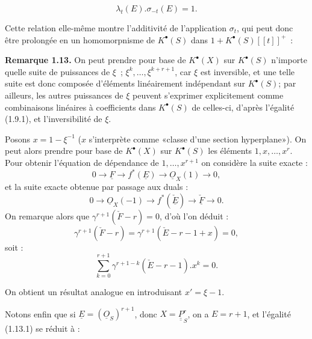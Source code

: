 
\begin{equation}\tag{1.12.1}
  \lambda_t(E).\sigma_{-t}(E)=1.
\end{equation}

Cette relation elle-même montre l'additivité de l'application \(\sigma_t\), qui peut donc être prolongée en un homomorpnisme de \(K^{\bullet}(S)\) dans \(1+K^{\bullet}(S)[[t]]^+\)~:

\textbf{Remarque 1.13.} On peut prendre pour base de \(K^{\bullet}(X)\) sur \(K^{\bullet}(S)\) n'importe quelle suite de puissances de \(\xi\)~; \(\xi^k,\ldots,\xi^{k+r+1}\), car \(\xi\) est inversible, et une telle suite est donc composée d'éléments linéairement indépendant sur \(K^{\bullet}(S)\); par ailleurs, les autres puissances de \(\xi\) peuvent s'exprimer explicitement comme combinaisons linéaires à coefficients dans \(K^{\bullet}(S)\) de celles-ci, d'après l'égalité (1.9.1), et l'inversibilité de \(\xi\).

Posons \(x=1-\xi^{-1}\) (\(x\) s'interprète comme «classe d'une section hyperplane»). On peut alors prendre pour base de \(K^{\bullet}(X)\) sur \(K^{\bullet}(S)\) les éléments \(1,x,\ldots,x^r\). Pour obtenir l'équation de dépendance de \(1,\ldots,x^{r+1}\) on considère la suite exacte :
\[
  0\longrightarrow \underline{F}\longrightarrow f^*(\underline{E})\longrightarrow \underline{O}_X(1)\longrightarrow0,
\]
et la suite exacte obtenue par passage aux duals :
\[
  0\longrightarrow \underline{O}_X(-1)\longrightarrow f^*(\check{\underline{E}})\longrightarrow \check{\underline{F}}\longrightarrow0.
\]
On remarque alors que \(\gamma^{r+1}(\check F-r)=0\), d'où l'on déduit :
\[
  \gamma^{r+1}(\check F-r)=\gamma^{r+1}(\check E-r-1+x)=0,
\]
soit :
\begin{equation}\tag{1.13.1}
  \sum_{k=0}^{r+1}\gamma^{r+1-k}(\check E-r-1).x^k=0.
\end{equation}

On obtient un résultat analogue en introduisant \(x'=\xi-1\).

Notons enfin que si \(\underline{E}=(\underline{O}_S)^{r+1}\), donc \(X=\underline{\underline{P}}_S^r\), on a \(E=r+1\), et l'égalité (1.13.1) se réduit à :
